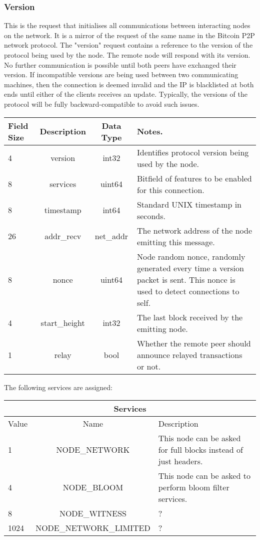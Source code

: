 \documentclass{article}
\begin{document}
\subsubsection{Version}
\label{subsubsec:versionreq}
This is the request that initialises all communications between interacting nodes on the network. It is a mirror of the request of the same name in the Bitcoin P2P network protocol.
The "version" request contains a reference to the version of the protocol being used by the node.
The remote node will respond with its version. No further communication is possible until both peers have exchanged their version.
\newline\newline
If incompatible versions are being used between two communicating machines, then the connection is deemed invalid and the IP is blacklisted at both ends until either of the clients receives an update. Typically, the versions of the protocol will be fully backward-compatible to avoid such issues.
\begin{center}
\begin{tabular}{ ||l|c|c|p{5cm}|| }
\hline
 Field Size & Description & Data Type & Notes. \\ 
\hline\hline
\rowcolor{g}
 4 & version & int32 & Identifies protocol version being used by the node. \\
\rowcolor{g}
 8 & services & uint64 & Bitfield of features to be enabled for this connection. \\
\rowcolor{g}
 8 & timestamp & int64 & Standard UNIX timestamp in seconds. \\  
\rowcolor{g}
 26 & addr\_recv & net\_addr & The network address of the node emitting this message. \\
\rowcolor{g}
 8 & nonce & uint64 & Node random nonce, randomly generated every time a version packet is sent. This nonce is used to detect connections to self. \\
\rowcolor{g}
 4 & start\_height & int32 & The last block received by the emitting node. \\
\rowcolor{g}
 1 & relay & bool & Whether the remote peer should announce relayed transactions or not. \\  
\hline
\end{tabular}
\end{center}

The following services are assigned:
\begin{center}
\begin{tabular}{ ||l|c|p{5cm}|| }
\hline
\multicolumn{3}{|c|}{Services} \\
\hline
 Value & Name & Description \\ 
\hline\hline
\rowcolor{g}
 1 & NODE\_NETWORK & This node can be asked for full blocks instead of just headers. \\
\rowcolor{g}
 4 & NODE\_BLOOM & This node can be asked to perform bloom filter services. \\  
\rowcolor{g}
 8 & NODE\_WITNESS & ? \\
 \rowcolor{g}
 1024 & NODE\_NETWORK\_LIMITED & ? \\
\hline
\end{tabular}
\end{center}
\end{document}

